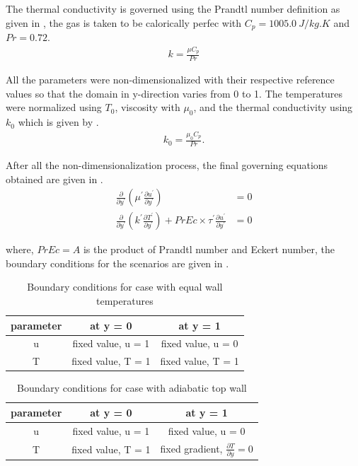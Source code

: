 \par The thermal conductivity is governed using the Prandtl number definition
as given in , the gas is taken to be calorically perfec with \(C_p = 1005.0 \ J/kg.K\)
and \(Pr = 0.72\).\\
\begin{align}
    k = \frac{\mu C_p}{Pr} \label{k_eqn}
\end{align}

\par All the parameters were non-dimensionalized with their respective reference
values so that the domain in y-direction varies from 0 to 1. The temperatures
were normalized using $T_0$, viscosity with $\mu_0$, and the thermal conductivity
using $k_0$ which is given by .
\begin{align}
    k_0 = \frac{\mu_0 C_p}{Pr} \label{k0_eqn}.
\end{align}

\par After all the non-dimensionalization process, the final governing equations
obtained are given in .
\begin{align}
    \frac{\partial}{\partial y^\prime}\left(\mu^\prime \frac{\partial u^{\prime}}{\partial y^\prime}\right) &= 0 \label{u_Feqn} \\
    \frac{\partial}{\partial y^\prime}\left(k^\prime \frac{\partial T^{\prime}}{\partial y^\prime}\right) + Pr Ec \times \tau^\prime\frac{\partial u^\prime}{\partial y^\prime} &= 0 \label{t_Feqn}
\end{align}

\par where, \(Pr Ec = A\) is the product of Prandtl number and Eckert number, the boundary conditions for the scenarios are given in .

\begin{table}
   \centering
    \caption{Boundary conditions for case with equal wall temperatures}
    \label{bc_ewt}
    \begin{tabular}{|c|c|c|}
        \hline
        parameter & at y = 0 & at y = 1 \\ \hline
        u & fixed value, u = 1 & fixed value, u = 0 \\ \hline
        T & fixed value, T = 1 & fixed value, T = 1 \\ \hline
    \end{tabular}
\end{table}

\begin{table}
   \centering
    \caption{Boundary conditions for case with adiabatic top wall}
    \label{bc_aw}
    \begin{tabular}{|c|c|c|}
        \hline
        parameter & at y = 0 & at y = 1 \\ \hline
        u & fixed value, u = 1 & fixed value, u = 0 \\ \hline
        T & fixed value, T = 1 & fixed gradient, \(\frac{\partial T}{\partial y} = 0\) \\ \hline
    \end{tabular}
\end{table}


